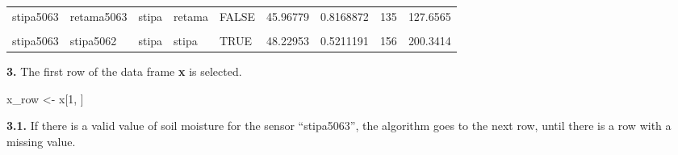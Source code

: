 \documentclass[]{article}
\newenvironment{Shaded}{\begin{snugshade}}{\end{snugshade}}
\newcommand{\DecValTok}[1]{\textcolor[rgb]{0.00,0.00,0.81}{#1}}
\newcommand{\NormalTok}[1]{#1}
\newcommand{\StringTok}[1]{\textcolor[rgb]{0.31,0.60,0.02}{#1}}
\begin{document}
\begin{table}[H]
{\begin{tabular}[t]{l|l|l|l|l|r|r|r|r}
\hline
\cellcolor{gray!6}{stipa5063} & \cellcolor{gray!6}{retama5062} & \cellcolor{gray!6}{stipa} & \cellcolor{gray!6}{retama} & \cellcolor{gray!6}{FALSE} & \cellcolor{gray!6}{31.63632} & \cellcolor{gray!6}{0.8561540} & \cellcolor{gray!6}{123} & \cellcolor{gray!6}{117.2517}\\
\hline
stipa5063 & retama5063 & stipa & retama & FALSE & 45.96779 & 0.8168872 & 135 & 127.6565\\
\hline
\cellcolor{gray!6}{stipa5063} & \cellcolor{gray!6}{stipa5094} & \cellcolor{gray!6}{stipa} & \cellcolor{gray!6}{stipa} & \cellcolor{gray!6}{TRUE} & \cellcolor{gray!6}{48.28543} & \cellcolor{gray!6}{0.5162195} & \cellcolor{gray!6}{146} & \cellcolor{gray!6}{199.9074}\\
\hline
stipa5063 & stipa5062 & stipa & stipa & TRUE & 48.22953 & 0.5211191 & 156 & 200.3414\\
\hline
\end{tabular}}
\end{table}

\textbf{3.} The first row of the data frame \textbf{x} is selected.

\begin{Shaded}
\begin{Highlighting}[]
\NormalTok{x_row <-}\StringTok{ }\NormalTok{x[}\DecValTok{1}\NormalTok{, ]}
\end{Highlighting}
\end{Shaded}

\begin{table}[H]
\centering
{}
\end{table}

\textbf{3.1.} If there is a valid value of soil moisture for the sensor
``stipa5063'', the algorithm goes to the next row, until there is a row
with a missing value.
\end{document}
